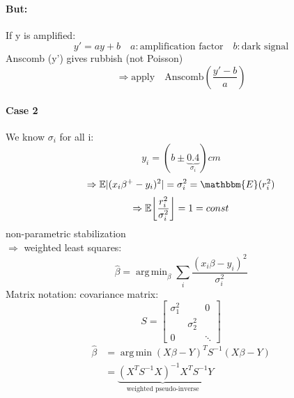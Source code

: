 \documentclass[11pt]{article}
\DeclareMathOperator*{\argmin}{arg\,min}
\DeclarePairedDelimiter\floor{\lfloor}{\rfloor}
\DeclarePairedDelimiter\abs{\lvert}{\rvert}
\begin{document}
\begin{itemize}
      \paragraph{But:} If y is amplified:
      \begin{equation*}
        y' = ay + b \quad a: \text{amplification factor} \quad b: \text{dark signal}
      \end{equation*}
      Anscomb (y') gives rubbish (not Poisson) \\
      \begin{equation*}
        \Rightarrow \text{apply} \quad \text{Anscomb} \left(\frac{y'-b}{a}\right)
      \end{equation*}
      \paragraph{Case 2} We know $\sigma_i$ for all i:
      \begin{equation*}
        y_i = \left(b \pm \underbrace{0.4}_{\sigma_i}\right) cm
      \end{equation*}
      \begin{equation*}
        \Rightarrow \mathbb{E} \abs{(x_i\beta^+-y_i)^2} = \sigma_i^2 = \mathbbm{E}(r_i^2)
      \end{equation*}
      \begin{equation*}
        \Rightarrow \mathbb{E} \floor*{\frac{r_i^2}{\sigma_i^2}} = 1 = const
      \end{equation*}
      non-parametric stabilization \\
      $\Rightarrow$ weighted least squares:
      \begin{equation*}
        \boxed{\hat{\beta} = \argmin_{\beta} \sum_i \frac{(x_i\beta-y_i)^2}{\sigma_i^2}}
      \end{equation*}
      Matrix notation: covariance matrix:
      \begin{equation*} S =
        \left[
        \begin{array}{ccc}
          \sigma_1^2 & & 0 \\
          & \sigma_2^2 & \\
          0 & & \ddots
        \end{array}
        \right]
      \end{equation*}
      \begin{equation*}
        \begin{align*}
          \hat{\beta} &= \argmin (X\beta-Y)^T S^{-1} (X\beta-Y) \\
          &= \underbrace{(X^TS^{-1}X)^{-1}X^TS^{-1}}_{\text{weighted pseudo-inverse}}Y

\end{align*}
\end{equation*}
\end{itemize}
\end{document}
